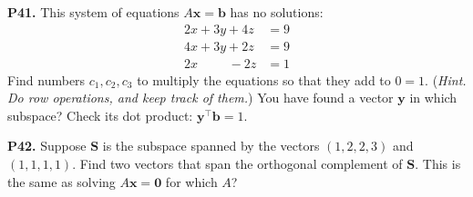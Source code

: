 \documentclass[12pt]{amsart}
\newcommand{\bb}{\bm{b}}
\newcommand{\bx}{\bm{x}}
\newcommand{\by}{\bm{y}}
\newcommand{\bS}{\bm{S}}
\newcommand{\bzero}{\bm{0}}
\newcommand{\prob}[1]{\bigskip\noindent\textbf{#1.}\quad }
\begin{document}
\prob{P41}  This system of equations $A\bx = \bb$ has no solutions:
\begin{align*}
2 x + 3 y + 4 z &= 9 \\
4 x + 3 y + 2 z &= 9 \\
2 x \phantom{+sxx} - 2 z &= 1
\end{align*}
Find numbers $c_1,c_2,c_3$ to multiply the equations so that they add to $0=1$.  (\emph{Hint.  Do row operations, and keep track of them.})  You have found a vector $\by$ in which subspace?  Check its dot product: $\by^\top \bb = 1$.


\prob{P42}  Suppose $\bS$ is the subspace spanned by the vectors $(1,2,2,3)$ and $(1,1,1,1)$.  Find two vectors that span the orthogonal complement of $\bS$.  This is the same as solving $A\bx = \bzero$ for which $A$?
\end{document}
